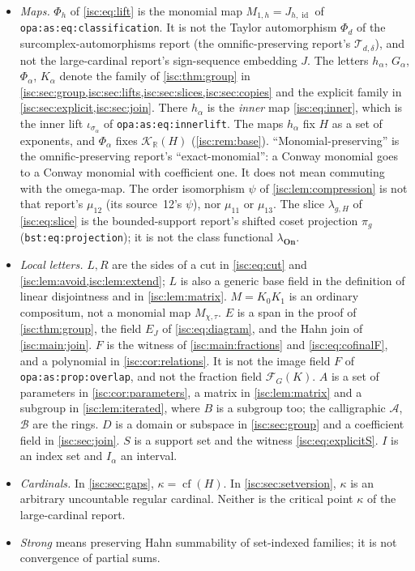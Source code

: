 \documentclass[11pt,letterpaper]{article}
\theoremstyle{definition}
\theoremstyle{remark}
\newcommand{\On}{\mathbf{On}}
\newcommand{\R}{\mathbb R}
\newcommand{\K}[2]{\mathcal K_{#1}(#2)}
\newcommand{\B}[2]{\mathcal B_{#1}(#2)}
\newcommand{\Frac}{\operatorname{Frac}}
\newcommand{\id}{\operatorname{id}}
\newcommand{\cf}{\operatorname{cf}}
\newcommand{\lbl}[1]{\nolinkurl{#1}}%
\numberwithin{equation}{section}
\begin{document}
\begin{itemize}[leftmargin=*,itemsep=3pt]
bounded-support report's $\mathcal B_H(k)$, with the two arguments in the
opposite order, and $\Frac\B{k}{H}$ is its $\mathcal F_H(k)$.
\item \emph{Maps.} $\Phi_h$ of \eqref{isc:eq:lift} is the monomial map
$M_{1,h}=J_{h,\id}$ of \lbl{opa:as:eq:classification}. It is not the
Taylor automorphism $\Phi_d$ of the surcomplex-automorphisms report
(the omnific-preserving report's $\mathcal T_{d,\delta}$), and not the
large-cardinal report's sign-sequence embedding $J$. The letters $h_\alpha$,
$G_\alpha$, $\Phi_\alpha$, $K_\alpha$ denote the family of
\cref{isc:thm:group} in \cref{isc:sec:group,isc:sec:lifts,isc:sec:slices,isc:sec:copies}
and the explicit family in \cref{isc:sec:explicit,isc:sec:join}. There
$h_\alpha$ is the \emph{inner} map \eqref{isc:eq:inner}, which is the inner
lift $\iota_{\sigma_\alpha}$ of \lbl{opa:as:eq:innerlift}. The maps
$h_\alpha$ fix $H$ as a set of exponents, and $\Phi_\alpha$ fixes
$\K{\R}{H}$ (\cref{isc:rem:base}). ``Monomial-preserving'' is the
omnific-preserving report's ``exact-monomial'': a Conway monomial goes to a
Conway monomial with coefficient one. It does not mean commuting with the
omega-map. The order isomorphism $\psi$ of \cref{isc:lem:compression} is
not that report's $\mu_{12}$ (its source~12's $\psi$), nor $\mu_{11}$ or
$\mu_{13}$. The slice $\lambda_{g,H}$ of \eqref{isc:eq:slice} is the
bounded-support report's shifted coset projection $\pi_g$
(\lbl{bst:eq:projection}); it is not the class functional $\lambda_{\On}$.
\item \emph{Local letters.} $L,R$ are the sides of a cut in
\eqref{isc:eq:cut} and \cref{isc:lem:avoid,isc:lem:extend}; $L$ is also a
generic base field in the definition of linear disjointness and in
\cref{isc:lem:matrix}. $M=K_0K_1$ is an ordinary compositum, not a
monomial map $M_{\chi,\tau}$. $E$ is a span in the proof of
\cref{isc:thm:group}, the field $E_J$ of \eqref{isc:eq:diagram}, and the
Hahn join of \cref{isc:main:join}. $F$ is the witness of
\cref{isc:main:fractions} and \eqref{isc:eq:cofinalF}, and a polynomial in
\cref{isc:cor:relations}. It is not the image field $F$ of
\lbl{opa:as:prop:overlap}, and not the fraction field $\mathcal F_G(K)$.
$A$ is a set of parameters in \cref{isc:cor:parameters}, a matrix in
\cref{isc:lem:matrix} and a subgroup in \cref{isc:lem:iterated}, where $B$
is a subgroup too; the calligraphic $\mathcal A$, $\mathcal B$ are the
rings. $D$ is a domain or subspace in \cref{isc:sec:group} and a
coefficient field in \cref{isc:sec:join}. $S$ is a support set and the
witness \eqref{isc:eq:explicitS}. $I$ is an index set and $I_\alpha$ an
interval.
\item \emph{Cardinals.} In \cref{isc:sec:gaps}, $\kappa=\cf(H)$. In
\cref{isc:sec:setversion}, $\kappa$ is an arbitrary uncountable regular
cardinal. Neither is the critical point $\kappa$ of the large-cardinal
report.
\item \emph{Strong} means preserving Hahn summability of set-indexed
families; it is not convergence of partial sums.
\end{itemize}
\end{document}
